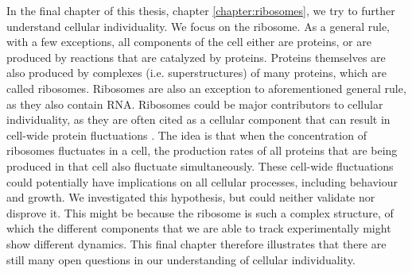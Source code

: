 In the final chapter of this thesis, chapter \ref{chapter:ribosomes}, we try to further understand cellular individuality.
%
We focus on the ribosome.
%
As a general rule, 
with a few exceptions, all components of the cell either are proteins, or are produced by reactions that are catalyzed by proteins.
%
Proteins themselves are also produced by complexes (i.e. superstructures) of many proteins, which are called ribosomes.
%
Ribosomes are also an exception to aforementioned general rule, 
as they also contain RNA.
Ribosomes could be major contributors to cellular individuality,
as they are often cited as a cellular component that can result in cell-wide protein fluctuations \cite{Davidson2008, Raj2008, Chalancon2012, Bruggeman2018}.
%
The idea is that when the concentration of ribosomes fluctuates in a cell, 
the production rates of all proteins that are being produced in that cell also fluctuate simultaneously.
%
These cell-wide fluctuations could potentially have implications on all cellular processes,
including behaviour and growth. 
%
We investigated this hypothesis, but could neither validate nor disprove it.
%
This might be because the ribosome is such a complex structure,
of which the different components that we are able to track experimentally might show different dynamics.
%
This final chapter therefore illustrates that there are still many open questions 
in our understanding of cellular individuality.


































